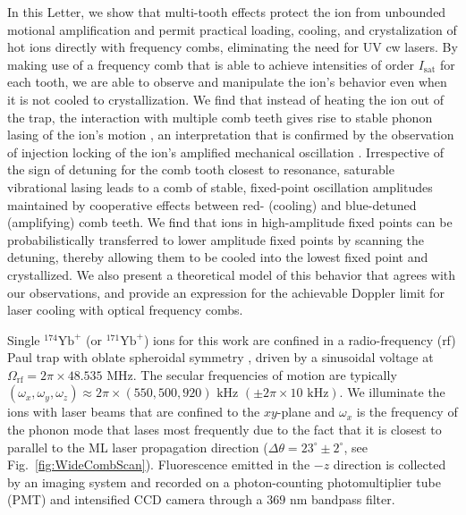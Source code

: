 \documentclass[preprint,superscriptaddress,amsmath,amssymb,aps,prl]{revtex4-1}
\begin{document}
In this Letter, we show that multi-tooth effects protect the ion from unbounded motional amplification and permit practical loading, cooling, and crystalization of hot ions directly with frequency combs, eliminating the need for UV cw lasers. By making use of a frequency comb that is able to achieve intensities of order $I_\mathrm{sat}$ for each tooth, we are able to observe and manipulate the ion's behavior even when it is not cooled to crystallization.  We find that instead of heating the ion out of the trap, the interaction with multiple comb teeth gives rise to stable phonon lasing of the ion's motion \cite{Vahala2009a,Xie2013pulsed}, an interpretation that is confirmed by the observation of injection locking of the ion's amplified mechanical oscillation \cite{Knunz2010injection}. Irrespective of the sign of detuning for the comb tooth closest to resonance, saturable vibrational lasing leads to a comb of stable, fixed-point oscillation amplitudes maintained by cooperative effects between red- (cooling) and blue-detuned (amplifying) comb teeth.  We find that ions in high-amplitude fixed points can be probabilistically transferred to lower amplitude fixed points by scanning the detuning, thereby allowing them to be cooled into the lowest fixed point and crystallized.  We also present a theoretical model of this behavior that agrees with our observations, and provide an expression for the achievable Doppler limit for laser cooling with optical frequency combs.

Single ${}^{174}\mathrm{Yb}^+$ (or ${}^{171}\mathrm{Yb}^+$) ions for this work are confined in a radio-frequency (rf) Paul trap with oblate spheroidal symmetry \cite{Yoshimura2015creation}, driven by a sinusoidal voltage at $\Omega_\mathrm{rf} = 2 \pi \times 48.535\mbox{ MHz}$.  The secular frequencies of motion are typically $(\omega_x,\omega_y,\omega_z) \approx 2 \pi \times (550,500,920)\mbox{ kHz } (\pm 2 \pi \times 10 \mbox{ kHz})$. We illuminate the ions with laser beams that are confined to the $xy$-plane and $\omega_x$ is the frequency of the phonon mode that lases most frequently due to the fact that it is closest to parallel to the ML laser propagation direction ($\Delta \theta = 23^\circ \pm 2^\circ$, see Fig.~\ref{fig:WideCombScan}). Fluorescence emitted in the $-z$ direction is collected by an imaging system and recorded on a photon-counting photomultiplier tube (PMT) and intensified CCD camera through a $369 \mbox{ nm}$ bandpass filter.
\end{document}
